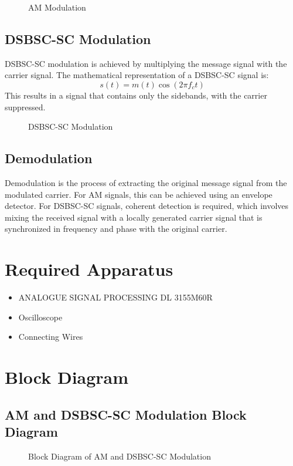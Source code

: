 \documentclass[12pt]{article}
\begin{document}
\begin{figure}[H]
    \centering
    \caption{AM Modulation}
    \label{fig:am_modulation}
\end{figure}

\subsection*{DSB\-SC-SC Modulation}
DSB\-SC-SC modulation is achieved by multiplying the message signal with the carrier signal. The mathematical representation of a DSB\-SC-SC signal is:
\[
    s(t) = m(t) \cos(2 \pi f_c t)
\]
This results in a signal that contains only the sidebands, with the carrier suppressed.

\begin{figure}[H]
    \centering
    \caption{DSB\-SC-SC Modulation}
    \label{fig:dsb_sc_modulation}
\end{figure}

\subsection*{Demodulation}
Demodulation is the process of extracting the original message signal from the modulated carrier. For AM signals, this can be achieved using an envelope detector. For DSB\-SC-SC signals, coherent detection is required, which involves mixing the received signal with a locally generated carrier signal that is synchronized in frequency and phase with the original carrier.

\section*{Required Apparatus}
\begin{itemize}
    \item ANALOGUE SIGNAL PROCESSING DL 3155M60R
    \item Oscilloscope
    \item Connecting Wires
\end{itemize}

\section*{Block Diagram}
\subsection*{AM and DSB\-SC-SC Modulation Block Diagram}
\begin{figure}[H]
    \centering
    \caption{Block Diagram of AM and DSB\-SC-SC Modulation}
    \label{fig:modulation_block_diagram}
\end{figure}
\end{document}
